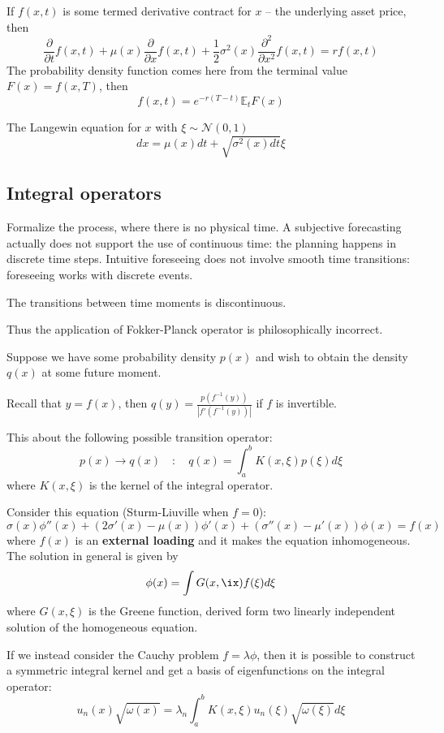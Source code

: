\documentclass[a4paper]{article}
\newcommand{\brac}[1]{{\left ( #1 \right )}}
\newcommand{\abs}[1]{{\left | #1 \right |}}
\newcommand{\Ex}{\mathbb{E}}
\begin{document}
If $f(x,t)$ is some termed derivative contract for $x$ -- the underlying asset price, then 
\[\frac{\partial}{\partial t} f(x,t) + \mu(x) \frac{\partial}{\partial x}f(x,t) + \frac{1}{2}\sigma^2(x) \frac{\partial^2}{\partial x^2} f(x,t) = r f(x,t)\] 
The probability density function comes here from the terminal value $F(x) = f(x,T)$, then \[f(x,t) = e^{-r(T-t)}\Ex_t F(x)\]

The Langewin equation for $x$ with $\xi\sim \mathcal{N}(0,1)$
\[dx  = \mu(x) dt + \sqrt{\sigma^2(x)dt}\xi\]


\subsection{Integral operators} %
\label{sub:integral_operators}

Formalize the process, where there is no physical time. A subjective forecasting actually does not support the use of continuous time: the planning happens in discrete time steps. Intuitive foreseeing does not involve smooth time transitions: foreseeing works with discrete events.

The transitions between time moments is discontinuous.

Thus the application of Fokker-Planck operator is philosophically incorrect.

Suppose we have some probability density $p(x)$ and wish to obtain the density $q(x)$ at some future moment.

Recall that $y=f(x)$, then $q(y) = \frac{p\brac{f^{-1}(y)}}{\abs{f'\brac{f^{-1}(y)}}}$ if $f$ is invertible.

This about the following possible transition operator:
\[p(x)\to q(x)\quad : \quad q(x) = \int_a^b K(x,\xi) p(\xi) d\xi\]
where $K(x,\xi)$ is the kernel of the integral operator. 

Consider this equation (Sturm-Liuville when $f = 0$):
\[\sigma(x) \phi''(x) + \brac{2\sigma'(x) - \mu(x)} \phi'(x) + \brac{\sigma''(x) - \mu'(x) } \phi(x) = f(x)\]
where $f(x)$ is an \textbf{external loading} and it makes the equation inhomogeneous. The solution in general is given by
\[\phi(x) = \int G(x,\ix) f(\xi) d\xi\]
where $G(x,\xi)$ is the Greene function, derived form two linearly independent solution of the homogeneous equation.

If we instead consider the Cauchy problem $f=\lambda \phi$, then it is possible to construct a symmetric integral kernel and get a basis of eigenfunctions on the integral operator:
\[u_n(x)\sqrt{\omega(x)} = \lambda_n \int_a^b K(x,\xi) u_n(\xi)\sqrt{\omega(\xi)} d\xi\]
\end{document}
